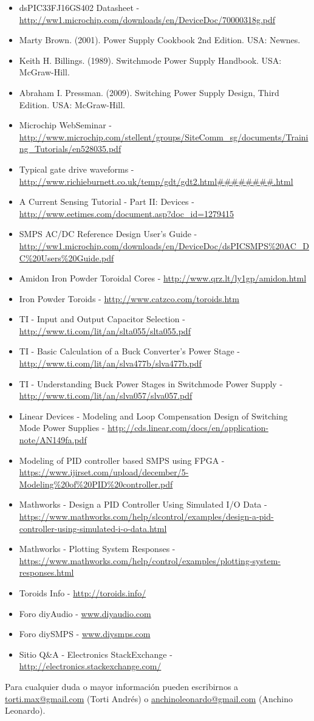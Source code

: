 \documentclass[12pt]{report}
\begin{document}
\begin{itemize}
	\item dsPIC33FJ16GS402 Datasheet - \url{http://ww1.microchip.com/downloads/en/DeviceDoc/70000318g.pdf}
	\item Marty Brown. (2001). Power Supply Cookbook 2nd Edition. USA: Newnes.
	\item Keith H. Billings. (1989). Switchmode Power Supply Handbook. USA: McGraw-Hill.
	\item Abraham I. Pressman. (2009). Switching Power Supply Design, Third Edition. USA: McGraw-Hill.
	\item Microchip WebSeminar - \url{http://www.microchip.com/stellent/groups/SiteComm_sg/documents/Training_Tutorials/en528035.pdf}
	\item Typical gate drive waveforms - \url{http://www.richieburnett.co.uk/temp/gdt/gdt2.html########.html}
	\item A Current Sensing Tutorial - Part II: Devices - \url{http://www.eetimes.com/document.asp?doc_id=1279415}
	\item SMPS AC/DC Reference Design User's Guide - \url{http://ww1.microchip.com/downloads/en/DeviceDoc/dsPICSMPS\%20AC_DC\%20Users\%20Guide.pdf}
	\item Amidon Iron Powder Toroidal Cores - \url{http://www.qrz.lt/ly1gp/amidon.html}
	\item Iron Powder Toroids - \url{http://www.catzco.com/toroids.htm}
	\item TI - Input and Output Capacitor Selection - \url{http://www.ti.com/lit/an/slta055/slta055.pdf}
	\item TI - Basic Calculation of a Buck Converter's Power Stage - \url{http://www.ti.com/lit/an/slva477b/slva477b.pdf}
	\item TI - Understanding Buck Power Stages in Switchmode Power Supply - \url{http://www.ti.com/lit/an/slva057/slva057.pdf}
	\item Linear Devices - Modeling and Loop Compensation Design of
	Switching Mode Power Supplies - \url{http://cds.linear.com/docs/en/application-note/AN149fa.pdf}
	\item Modeling of PID controller based SMPS using
	FPGA - \url{https://www.ijirset.com/upload/december/5-Modeling\%20of\%20PID\%20controller.pdf}
	\item Mathworks - Design a PID Controller Using Simulated I/O Data - \url{https://www.mathworks.com/help/slcontrol/examples/design-a-pid-controller-using-simulated-i-o-data.html}
	\item Mathworks - Plotting System Responses - \url{https://www.mathworks.com/help/control/examples/plotting-system-responses.html}
	\item Toroids Info - \url{http://toroids.info/}
	\item Foro diyAudio - \url{www.diyaudio.com}
	\item Foro diySMPS - \url{www.diysmps.com}
	\item Sitio Q\&A - Electronics StackExchange - \url{http://electronics.stackexchange.com/}
\end{itemize}

Para cualquier duda o mayor información pueden escribirnos a \href{mailto:torti.max@gmail.com}{torti.max@gmail.com} (Torti Andrés) o \href{mailto:anchinoleonardo@gmail.com}{anchinoleonardo@gmail.com} (Anchino Leonardo).
\end{document}
